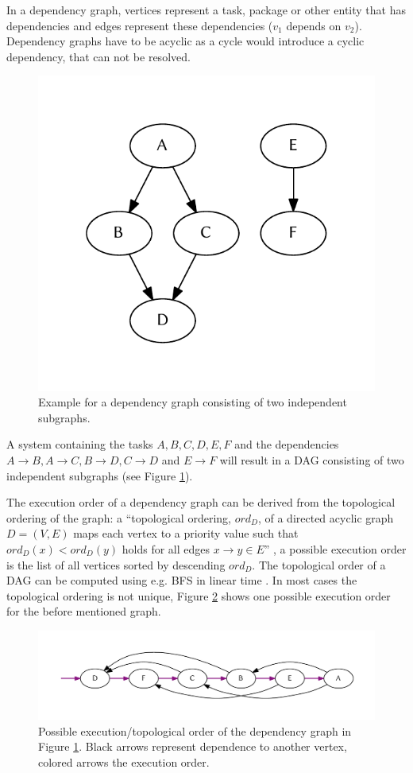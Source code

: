 		In a dependency graph, vertices represent a task, package or other entity that has dependencies and edges represent these dependencies ($v_1$ depends on $v_2$). Dependency graphs have to be acyclic as a cycle would introduce a cyclic dependency, that can not be resolved.

		\begin{figure}[!htb]
			\centering
			\includegraphics[width=.4474\textwidth]{figures/unordered-graph.pdf} %
			\caption{\label{fig:graph:unordered} Example for a dependency graph consisting of two independent subgraphs.}
		\end{figure}
		A system containing the tasks $A, B, C, D, E, F$ and the dependencies $A\rightarrow B, A\rightarrow C, B\rightarrow D, C\rightarrow D$ and $E\rightarrow F$ will result in a \ac{DAG} consisting of two independent subgraphs (see Figure \ref{fig:graph:unordered}).

		The execution order of a dependency graph can be derived from the topological ordering of the graph: a ``topological ordering, $ord_D$, of a directed acyclic graph $D = (V, E)$ maps each vertex to a priority value such that $ord_{D}(x) < ord_{D}(y)$ holds for all edges $x \rightarrow y \in E$'' \citep{pearce2007dynamic}, a possible execution order is the list of all vertices sorted by descending $ord_D$. The topological order of a \ac{DAG} can be computed using e.g. \ac{BFS} in linear time \citep{cormen2001introduction}. In most cases the topological ordering is not unique, Figure \ref{fig:graph:ordered} shows one possible execution order for the before mentioned graph.
		\begin{figure}[!htb]
			\centering
			\includegraphics[width=1\textwidth]{figures/ordered-graph.pdf} %
			\caption{\label{fig:graph:ordered} Possible execution/topological order of the dependency graph in Figure \ref{fig:graph:unordered}. Black arrows represent dependence to another vertex, colored arrows the execution order.}
		\end{figure}

